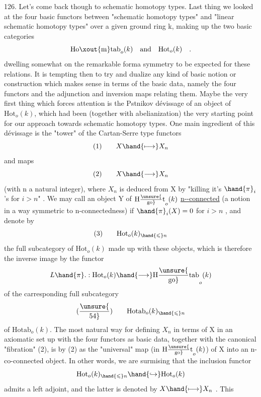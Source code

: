  

126.      Let's come back though to schematic homotopy types.  Last thing
we looked at  the four basic functors between "schematic homotopy
types"  and "linear schematic homotopy types" over a given ground ring k,
making up the two basic categories
\[ \mathrm{Ho\xout{m}tab}_o(k) \quad \text{and} \quad \mathrm{Hot}_o(k) \quad . \]
 dwelling somewhat on the remarkable forma symmetry to be expected
for these relations.  It  is tempting then to try and dualize any
kind of basic notion or construction which makes sense in terms of the
basic data,  namely the four functors and the adjunction and inversion
maps relating them.  Maybe the very first thing which forces attention
is the Pstnikov  dévissage of an object of $\mathrm{Hot}_o(k)$,  which
had been (together with abelianization) the very starting point for our
approach towards schematic homotopy types.   One main ingredient of this
dévissage is the "tower" of the Cartan-Serre type functors
\[ (1) \qquad X \hand{\longmapsto} X_n \]
and maps
\[ (2) \qquad X \hand{\longrightarrow} X_n \]
(with n a natural integer),  where $X_n$ is deduced from X by "killing it's
$\hand{\pi}_i$'s  for  $i > n$" .  We may  call an object Y of $\mathrm{H\unsure{\over{g}{o}}t}_o(k)$
\uline{n-}\uline{-connected}  (a notion in a way  symmetric to n-connectedness)
if  $\hand{\pi}_i(X) = 0$  for  $i > n$ ,  and denote by
\[ (3) \qquad \mathrm{Hot}_o(k)_{\hand{\leqslant} n} \]
the full subcategory of $\mathrm{Hot}_o(k)$ made up with these objects,  which is
therefore the inverse image by the functor
\[ L\hand{\pi}. : \mathrm{Hot}_o(k) \hand{\longrightarrow} \mathrm{H\unsure{\over{g}{o}}tab}_o(k) \]
of the carresponding full subcategory
\[ (\unsure{\over{5}{4}}) \qquad \mathrm{Hotab}_o(k)_{\hand{\leqslant} n} \]
of $\mathrm{Hotab}_o(k)$.  The most natural way for defining $X_n$ in terms of X \hand{(}in
an axiomatic set up with the four functors as basic data,\hand{)}  together with
the canonical "fibration" (2),  is by  (2) as the "universal"
map (in $\mathrm{H\unsure{\over{g}{o}}t}_o(k)$)  of X into an  n-co-connected object.  In other words,
we are surmising  that the inclusion functor
\[ \mathrm{Hot}_o(k)_{\hand{\leqslant} n} \hand{\hookrightarrow} \mathrm{Hot}_o(k) \]
admits a left adjoint,  and the latter is denoted by  $X \hand{\longmapsto} X_n$ .   This

